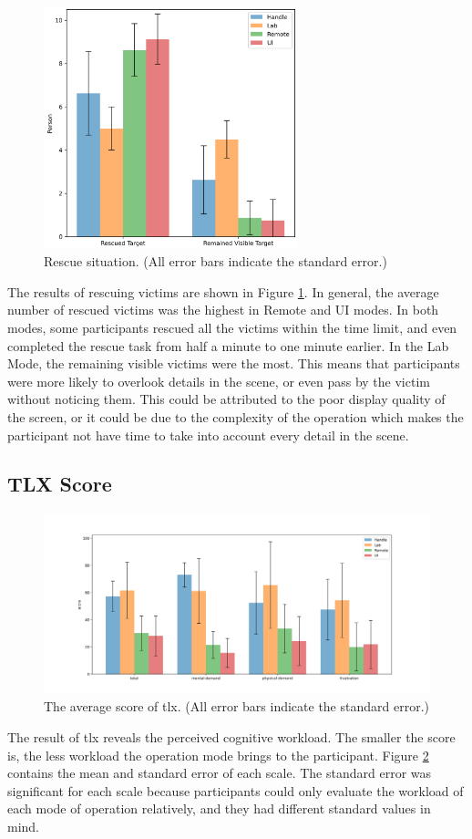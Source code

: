 \begin{figure}[htbp]
    \centering
    \includegraphics[height=7cm]{graphics/Rescue situation2.png}
    \caption{Rescue situation. (All error bars indicate the standard error.)} 
    \label{fig:rescue}
\end{figure}
The results of rescuing victims are shown in Figure \ref{fig:rescue}. In general, the average number of rescued victims was the highest in Remote and UI modes. In both modes, some participants rescued all the victims within the time limit, and even completed the rescue task from half a minute to one minute earlier. In the Lab Mode, the remaining visible victims were the most. This means that participants were more likely to overlook details in the scene, or even pass by the victim without noticing them. This could be attributed to the poor display quality of the screen, or it could be due to the complexity of the operation which makes the participant not have time to take into account every detail in the scene.


\subsection{TLX Score}
\begin{figure}[htbp]
    \centering
    \includegraphics[width=\textwidth]{graphics/tlx6.jpg}
    \caption{The average score of \gls{tlx}. (All error bars indicate the standard error.)}
    \label{fig:tlx} 
\end{figure}
The result of \gls{tlx} reveals the perceived cognitive workload. The smaller the score is, the less workload the operation mode brings to the participant. Figure \ref{fig:tlx} contains the mean and standard error of each scale. The standard error was significant for each scale because participants could only evaluate the workload of each mode of operation relatively, and they had different standard values in mind. 

